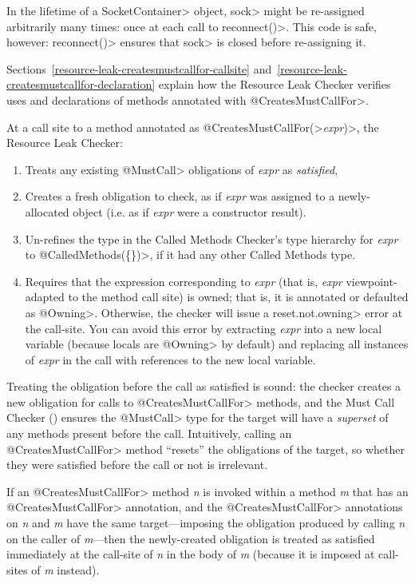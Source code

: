 In the lifetime of a \<SocketContainer> object, \<sock>
might be re-assigned arbitrarily many times: once at each
call to \<reconnect()>. This code is safe, however: \<reconnect()>
ensures that \<sock> is closed before re-assigning it.

Sections~\ref{resource-leak-createsmustcallfor-callsite}
and~\ref{resource-leak-createsmustcallfor-declaration}
explain how the Resource Leak Checker verifies uses and declarations of
methods annotated with \<@CreatesMustCallFor>.



At a call site to a method annotated as
\<@CreatesMustCallFor(>\emph{expr}\<)>, the Resource Leak Checker:
\begin{enumerate}
\item
  Treats any existing \<@MustCall> obligations of \emph{expr} as \emph{satisfied},
\item
  Creates a fresh obligation to check, as if \emph{expr} was assigned to a newly-allocated
  object (i.e. as if \emph{expr} were a constructor result).
\item
  Un-refines the type in the Called Methods Checker's type hierarchy for \emph{expr} to
  \<@CalledMethods(\{\})>, if it had any other Called Methods type.
\item
  Requires that the expression corresponding to \emph{expr} (that is, \emph{expr}
  viewpoint-adapted to the method call site) is owned; that is, it is
  annotated or defaulted as \<@Owning>.  Otherwise, the checker
  will issue a \<reset.not.owning> error at the call-site. You can avoid this
  error by extracting \emph{expr} into a new local variable (because
  locals are \<@Owning> by default) and replacing all instances of \emph{expr}
  in the call with references to the new local variable.
\end{enumerate}

Treating the obligation before the call as satisfied is sound: the
checker creates a new obligation for calls to \<@CreatesMustCallFor> methods,
and the Must Call Checker () ensures the
\<@MustCall> type for the target will have a \emph{superset} of any methods
present before the call. Intuitively, calling an \<@CreatesMustCallFor> method
``resets'' the obligations of the target, so whether they were satisfied before
the call or not is irrelevant.

If an \<@CreatesMustCallFor>
method \emph{n} is invoked within a method \emph{m} that has an \<@CreatesMustCallFor> annotation,
and the \<@CreatesMustCallFor> annotations on \emph{n} and \emph{m} have
the same target---imposing the obligation produced by calling \emph{n} on the caller of \emph{m}---then
the newly-created obligation is treated as satisfied immediately
at the call-site of \emph{n} in the body of \emph{m} (because it is imposed at call-sites of \emph{m}
instead).


